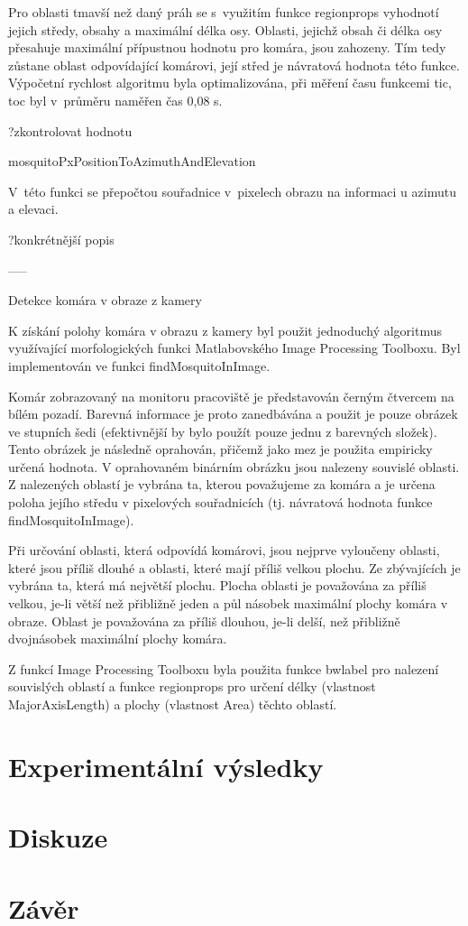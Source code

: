 \documentclass[a4paper,10pt]{article}
\begin{document}
Pro oblasti tmavší než daný práh se s~využitím funkce regionprops vyhodnotí jejich středy, obsahy a maximální délka osy. Oblasti, jejichž obsah či délka osy přesahuje maximální přípustnou hodnotu pro komára, jsou zahozeny. Tím tedy zůstane oblast odpovídající komárovi, její střed je návratová hodnota této funkce. Výpočetní rychlost algoritmu byla optimalizována, při měření času funkcemi tic, toc byl v~průměru naměřen čas 0,08 s.

?zkontrolovat hodnotu

mosquitoPxPositionToAzimuthAndElevation

V~této funkci se přepočtou souřadnice v~pixelech obrazu na informaci u azimutu a elevaci.

?konkrétnější popis

-----

Detekce komára v obraze z kamery

K získání polohy komára v obrazu z kamery byl použit jednoduchý algoritmus využívající morfologických funkci Matlabovského Image Processing Toolboxu. Byl implementován ve funkci findMosquitoInImage.

Komár zobrazovaný na monitoru pracoviště je představován černým čtvercem na bílém pozadí. Barevná informace je proto zanedbávána a použit je pouze obrázek ve stupních šedi (efektivnější by bylo použít pouze jednu z barevných složek). Tento obrázek je následně oprahován, přičemž jako mez je použita empiricky určená hodnota. V oprahovaném binárním obrázku jsou nalezeny souvislé oblasti. Z nalezených oblastí je vybrána ta, kterou považujeme za komára a je určena poloha jejího středu v pixelových souřadnicích (tj. návratová hodnota funkce findMosquitoInImage).

Při určování oblasti, která odpovídá komárovi, jsou nejprve vyloučeny oblasti, které jsou příliš dlouhé a oblasti, které mají příliš velkou plochu. Ze zbývajících je vybrána ta, která má největší plochu. Plocha oblasti je považována za příliš velkou, je-li větší než přibližně jeden a půl násobek maximální plochy komára v obraze. Oblast je považována za příliš dlouhou, je-li delší, než přibližně dvojnásobek maximální plochy komára.

Z funkcí Image Processing Toolboxu byla použita funkce bwlabel pro nalezení souvislých oblastí a funkce regionprops pro určení délky (vlastnost MajorAxisLength) a plochy (vlastnost Area) těchto oblastí.


\section{Experimentální výsledky}
\section{Diskuze}
\section{Závěr}
\end{document}
